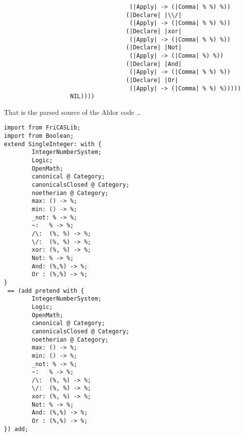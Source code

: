 \documentclass{article}
\begin{document}
\begin{verbatim}
                                    (|Apply| -> (|Comma| % %) %))
                                   (|Declare| |\\/|
                                    (|Apply| -> (|Comma| % %) %))
                                   (|Declare| |xor|
                                    (|Apply| -> (|Comma| % %) %))
                                   (|Declare| |Not|
                                    (|Apply| -> (|Comma| %) %))
                                   (|Declare| |And|
                                    (|Apply| -> (|Comma| % %) %))
                                   (|Declare| |Or|
                                    (|Apply| -> (|Comma| % %) %)))))
                   NIL))))
\end{verbatim}
That is the parsed source of the Aldor code \ldots
\begin{verbatim}
import from FriCASLib;
import from Boolean;
extend SingleInteger: with {
        IntegerNumberSystem;
        Logic;
        OpenMath;
        canonical @ Category;
        canonicalsClosed @ Category;
        noetherian @ Category;
        max: () -> %;
        min: () -> %;
        _not: % -> %;
        ~:   % -> %;
        /\:  (%, %) -> %;
        \/:  (%, %) -> %;
        xor: (%, %) -> %;
        Not: % -> %;
        And: (%,%) -> %;
        Or : (%,%) -> %;
}
 == (add pretend with {
        IntegerNumberSystem;
        Logic;
        OpenMath;
        canonical @ Category;
        canonicalsClosed @ Category;
        noetherian @ Category;
        max: () -> %;
        min: () -> %;
        _not: % -> %;
        ~:   % -> %;
        /\:  (%, %) -> %;
        \/:  (%, %) -> %;
        xor: (%, %) -> %;
        Not: % -> %;
        And: (%,%) -> %;
        Or : (%,%) -> %;
}) add;
\end{verbatim}











\end{document}
